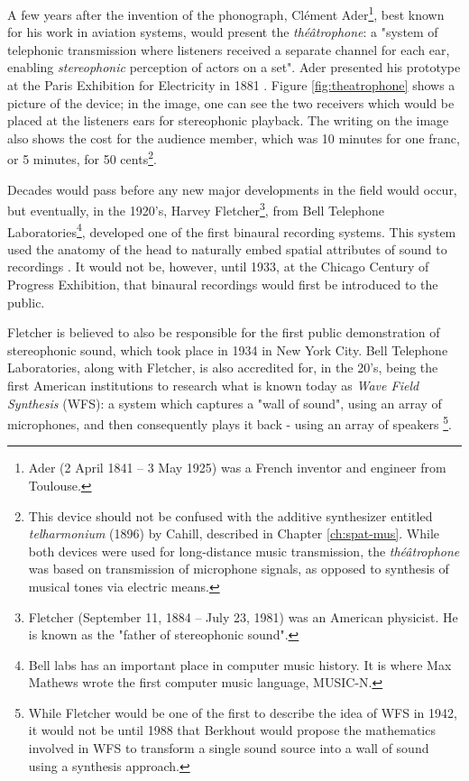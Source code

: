 A few years after the invention of the phonograph, Clément Ader\footnote{Ader (2 April 1841 – 3 May 1925) was a French inventor and engineer from Toulouse.}, best known for his work in aviation systems, would present the \textit{théâtrophone}: a "system of telephonic transmission where listeners received a separate channel for each ear, enabling \textit{stereophonic} perception of actors on a set". Ader presented his prototype at the Paris Exhibition for Electricity in 1881 \cite{malham19953}. Figure \ref{fig:theatrophone} shows a picture of the device; in the image, one can see the two receivers which would be placed at the listeners ears for stereophonic playback. The writing on the image also shows the cost for the audience member, which was 10 minutes for one franc, or 5 minutes, for 50 cents\footnote{This device should not be confused with the additive synthesizer entitled \textit{telharmonium} (1896) by Cahill, described in Chapter \ref{ch:spat-mus}. While both devices were used for long-distance music transmission, the \textit{théâtrophone} was based on transmission of microphone signals, as opposed to synthesis of musical tones via electric means.}.  

Decades would pass before any new major developments in the field would occur, but eventually, in the 1920's, Harvey Fletcher\footnote{Fletcher (September 11, 1884 – July 23, 1981) was an American physicist. He is known as the "father of stereophonic sound".}, from Bell Telephone Laboratories\footnote{Bell labs has an important place in computer music history. It is where Max Mathews wrote the first computer music language, MUSIC-N.}, developed one of the first binaural recording systems. This system used the anatomy of the head to naturally embed spatial attributes of sound to recordings \cite{harvey1927binaural}. It would not be, however, until 1933, at the Chicago Century of Progress Exhibition, that binaural recordings would first be introduced to the public. 

Fletcher is believed to also be responsible for the first public demonstration of stereophonic sound, which took place in 1934 in New York City. Bell Telephone Laboratories, along with Fletcher, is also accredited for, in the 20's, being the first American institutions to research what is known today as \textit{Wave Field Synthesis} (WFS): a system which captures a "wall of sound", using an array of microphones, and then consequently plays it back - using an array of speakers \cite{fletcher1942hearing}\footnote{While Fletcher would be one of the first to describe the idea of WFS in 1942, it would not be until 1988 that Berkhout would propose the mathematics involved in WFS to transform a single sound source into a wall of sound using a synthesis approach.}.

